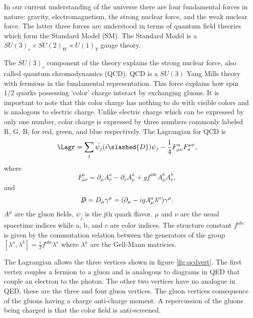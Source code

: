 
In our current understanding of the universe there are four fundamental forces in nature: gravity, electromagnetism, the strong nuclear force, and the weak nuclear force.
The latter three forces are understood in terms of quantum field theories which form the Standard Model (SM).
The Standard Model is a $SU(3)_c\times SU(2)_W\times U(1)_Y$ gauge theory.

The $SU(3)_c$ component of the theory explains the strong nuclear force, also called quantum chromodynamics (QCD).
QCD is a $SU(3)$ Yang Mills theory with fermions in the fundamental representation.
This force explains how spin 1/2 quarks possessing `color' charge interact by exchanging gluons.
It is important to note that this color charge has nothing to do with visible colors and is analogous to electric charge.
Unlike electric charge which can be expressed by only one number, color charge is expressed by three numbers commonly labeled R, G, B, for red, green, and blue respectively.
The Lagrangian for QCD is
\begin{equation}
  \label{eq:qcd}
  \Lagr = \sum_j\bar{\psi_j}(i\slashed{D})\psi_j-\frac{1}{4}F^a_{\mu\nu}F^{\mu\nu}_a,
\end{equation}
where
\begin{equation}
  F^a_{\mu\nu}=\partial_\mu A^a_\nu-\partial_\nu A^a_\mu+gf^{abc}A^b_\mu A^b_\nu,
\end{equation}
and
\begin{equation}
  \slashed{D}=D_\mu\gamma^\mu=(\partial_\mu-igA^a_\mu\lambda^a)\gamma^\mu.
\end{equation}
$A^\mu$ are the gluon fields, $\psi_j$ is the jth quark flavor.
$\mu$ and $\nu$ are the usual spacetime indices while a, b, and c are color indices.
The structure constant $f^{abc}$ is given by the commutation relation between the generators of the group $[\lambda^a,\lambda^b]=\frac{i}{2}f^{abc}\lambda^c$ where $\lambda^a$ are the Gell-Mann matricies.

The Lagrangian allows the three vertices shown in figure \ref{fig:qcdvert}.
The first vertex couples a fermion to a gluon and is analogous to diagrams in QED that couple an electron to the photon.
The other two vertices have no analogue in QED, these are the three and four gluon vertices.
The gluon vertices consequence of the gluons having a charge anti-charge moment.
A repercussion of the gluons being charged is that the color field is anti-screened.

